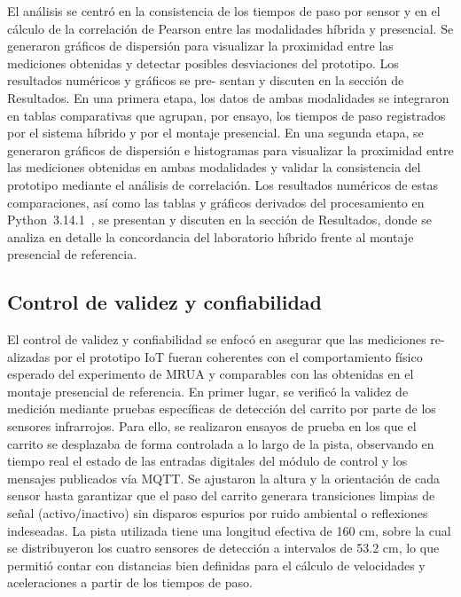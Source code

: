 \documentclass[journal,article,submit,pdftex]{Definitions/mdpi}
\begin{document}
El an\'alisis se centr\'o en la consistencia de los tiempos de paso por sensor y en el c\'alculo de la correlaci\'on de Pearson entre las modalidades h\'ibrida y presencial. Se generaron gr\'aficos de dispersi\'on para visualizar la proximidad entre las mediciones obtenidas y detectar posibles desviaciones del prototipo. Los resultados num\'ericos y gr\'aficos se pre- sentan y discuten en la secci\'on de Resultados. En una primera etapa, los datos de ambas modalidades se integraron en tablas comparativas que agrupan, por ensayo, los tiempos de paso registrados por el sistema h\'ibrido y por el montaje presencial. En una segunda etapa, se generaron gr\'aficos de dispersi\'on e histogramas para visualizar la proximidad entre las mediciones obtenidas en ambas modalidades y validar la consistencia del prototipo mediante el an\'alisis de correlaci\'on. Los resultados num\'ericos de estas comparaciones, as\'i como las tablas y gr\'aficos derivados del procesamiento en Python~3.14.1~\cite{r47}, se presentan y discuten en la secci\'on de Resultados, donde se analiza en detalle la concordancia del laboratorio h\'ibrido frente al montaje presencial de referencia.


\subsection{Control de validez y confiabilidad}

El control de validez y confiabilidad se enfoc\'o en asegurar que las mediciones re- alizadas por el prototipo IoT fueran coherentes con el comportamiento f\'isico esperado del experimento de MRUA y comparables con las obtenidas en el montaje presencial de referencia. En primer lugar, se verific\'o la validez de medici\'on mediante pruebas espec\'ificas de detecci\'on del carrito por parte de los sensores infrarrojos. Para ello, se realizaron ensayos de prueba en los que el carrito se desplazaba de forma controlada a lo largo de la pista, observando en tiempo real el estado de las entradas digitales del m\'odulo de control y los mensajes publicados v\'ia MQTT. Se ajustaron la altura y la orientaci\'on de cada sensor hasta garantizar que el paso del carrito generara transiciones limpias de se\~nal (activo/inactivo) sin disparos espurios por ruido ambiental o reflexiones indeseadas. La pista utilizada tiene una longitud efectiva de 160 cm, sobre la cual se distribuyeron los cuatro sensores de detecci\'on a intervalos de 53.2 cm, lo que permiti\'o contar con distancias bien definidas para el c\'alculo de velocidades y aceleraciones a partir de los tiempos de paso.
\end{document}
